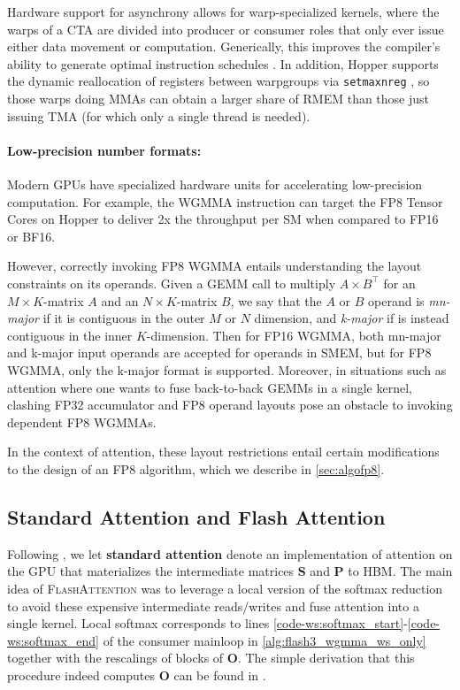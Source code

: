 \documentclass{article}
\newcommand{\vS}{\mathbf{S}}
\newcommand{\vP}{\mathbf{P}}
\newcommand{\vO}{\mathbf{O}}
\newcommand{\fa}{\textsc{FlashAttention}\xspace}
\begin{document}
Hardware support for asynchrony allows for warp-specialized kernels, where the warps of a CTA are divided into producer or consumer roles that only ever issue either data movement or computation.
Generically, this improves the compiler's ability to generate optimal instruction schedules \citep{warp-specialization-2011}.
In addition, Hopper supports the dynamic reallocation of registers between warpgroups via \verb|setmaxnreg| \cite[\S9.7.17.1]{ptx}, so those warps doing MMAs can obtain a larger share of RMEM than those just issuing TMA (for which only a single thread is needed).




\paragraph{Low-precision number formats:}
\label{sec:low-precision-gpu}
Modern GPUs have specialized hardware units for accelerating low-precision computation.
For example, the WGMMA instruction can target the FP8 Tensor Cores on Hopper to deliver 2x the throughput per SM when compared to FP16 or BF16.

However, correctly invoking FP8 WGMMA entails understanding the layout constraints on its operands. 
Given a GEMM call to multiply $A \times B^{\top}$ for an $M\times K$-matrix $A$ and an $N\times K$-matrix $B$, we say that the $A$ or $B$ operand is \emph{mn-major} if it is contiguous in the outer $M$ or $N$ dimension, and \emph{k-major} if is instead contiguous in the inner $K$-dimension.
Then for FP16 WGMMA, both mn-major and k-major input operands are accepted for operands in SMEM, but for FP8 WGMMA, only the k-major format is supported.
Moreover, in situations such as attention where one wants to fuse back-to-back GEMMs in a single kernel, clashing FP32 accumulator and FP8 operand layouts pose an obstacle to invoking dependent FP8 WGMMAs.

In the context of attention, these layout restrictions entail certain modifications to the design of an FP8 algorithm, which we describe in \cref{sec:algofp8}.

\subsection{Standard Attention and Flash Attention}
Following \citet{dao2022flashattention}, we let \textbf{standard attention} denote an implementation of attention on the GPU that materializes the intermediate matrices $\vS$ and $\vP$ to HBM. The main idea of \fa was to leverage a local version of the softmax reduction to avoid these expensive intermediate reads/writes and fuse attention into a single kernel. Local softmax corresponds to lines \ref{code-ws:softmax_start}-\ref{code-ws:softmax_end} of the consumer mainloop in \cref{alg:flash3_wgmma_ws_only} together with the rescalings of blocks of $\vO$. The simple derivation that this procedure indeed computes $\vO$ can be found in \cite[\S 2.3.1]{dao2023flashattention2}.
\end{document}
